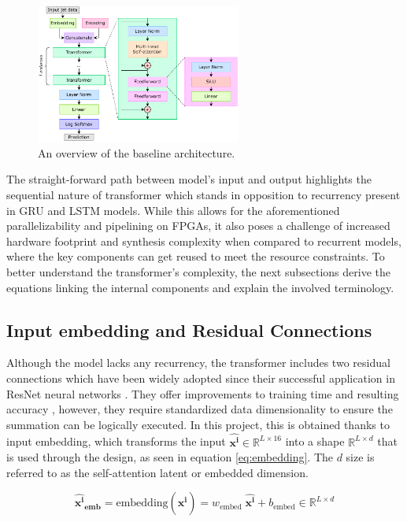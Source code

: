 \begin{figure}[hpt!]
  \centering
  \includegraphics[trim={0cm 0cm 0cm 0cm}, width=0.6\textwidth, center]{models/constituent_net.pdf}
  \caption{An overview of the baseline architecture.}
  \label{fig:constituent-net}
\end{figure}

The straight-forward path between model's input and output highlights the sequential nature of transformer which stands in opposition to recurrency present in GRU and LSTM models. While this allows for the aforementioned parallelizability and pipelining on FPGAs, it also poses a challenge of increased hardware footprint and synthesis complexity when compared to recurrent models, where the key components can get reused to meet the resource constraints. To better understand the transformer's complexity, the next subsections derive the equations linking the internal components and explain the involved terminology.


\subsection{Input embedding and Residual Connections}
Although the model lacks any recurrency, the transformer includes two residual connections which have been widely adopted since their successful application in ResNet neural networks \cite{75-kaiming2016deep}. They offer improvements to training time and resulting accuracy \cite{74-szegedy2016inception-v4}, however, they require standardized data dimensionality to ensure the summation can be logically executed. In this project, this is obtained thanks to input embedding, which transforms the input \(\bm{\hat{x^i}} \in \mathbb{R}^{L \times 16} \) into a shape \(\mathbb{R}^{L \times d}\) that is used through the design, as seen in equation \ref{eq:embedding}. The \(d\) size is referred to as the self-attention latent or embedded dimension.

\begin{equation}\label{eq:embedding}
  \bm{\hat{x^i}_{\text{emb}}} = \text{embedding} ( \bm{\hat{x^i}} ) = w_{\text{embed}}\; \bm{\hat{x^i}} + b_{\text{embed}} \in \mathbb{R}^{L \times d}
\end{equation}

